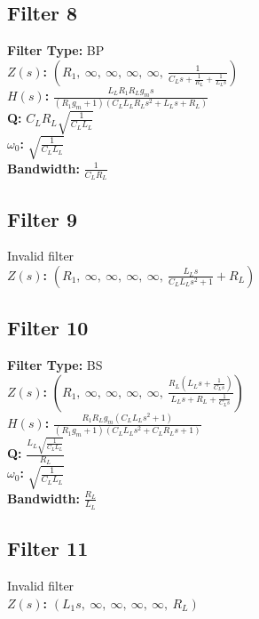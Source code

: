 \documentclass{article}
\begin{document}
\subsection*{Filter 8}
\textbf{Filter Type:} BP \\ 
\textbf{$Z(s)$:} $\left( R_{1}, \  \infty, \  \infty, \  \infty, \  \infty, \  \frac{1}{C_{L} s + \frac{1}{R_{L}} + \frac{1}{L_{L} s}}\right)$ \\ 
\textbf{$H(s)$:} $\frac{L_{L} R_{1} R_{L} g_{m} s}{\left(R_{1} g_{m} + 1\right) \left(C_{L} L_{L} R_{L} s^{2} + L_{L} s + R_{L}\right)}$ \\ 
\textbf{Q:} $C_{L} R_{L} \sqrt{\frac{1}{C_{L} L_{L}}}$ \\ 
\textbf{$\omega_0$:} $\sqrt{\frac{1}{C_{L} L_{L}}}$ \\ 
\textbf{Bandwidth:} $\frac{1}{C_{L} R_{L}}$ \\ 
\subsection*{Filter 9}
Invalid filter \\ 
\textbf{$Z(s)$:} $\left( R_{1}, \  \infty, \  \infty, \  \infty, \  \infty, \  \frac{L_{L} s}{C_{L} L_{L} s^{2} + 1} + R_{L}\right)$ \\ 
\subsection*{Filter 10}
\textbf{Filter Type:} BS \\ 
\textbf{$Z(s)$:} $\left( R_{1}, \  \infty, \  \infty, \  \infty, \  \infty, \  \frac{R_{L} \left(L_{L} s + \frac{1}{C_{L} s}\right)}{L_{L} s + R_{L} + \frac{1}{C_{L} s}}\right)$ \\ 
\textbf{$H(s)$:} $\frac{R_{1} R_{L} g_{m} \left(C_{L} L_{L} s^{2} + 1\right)}{\left(R_{1} g_{m} + 1\right) \left(C_{L} L_{L} s^{2} + C_{L} R_{L} s + 1\right)}$ \\ 
\textbf{Q:} $\frac{L_{L} \sqrt{\frac{1}{C_{L} L_{L}}}}{R_{L}}$ \\ 
\textbf{$\omega_0$:} $\sqrt{\frac{1}{C_{L} L_{L}}}$ \\ 
\textbf{Bandwidth:} $\frac{R_{L}}{L_{L}}$ \\ 
\subsection*{Filter 11}
Invalid filter \\ 
\textbf{$Z(s)$:} $\left( L_{1} s, \  \infty, \  \infty, \  \infty, \  \infty, \  R_{L}\right)$ \\ 
\end{document}
